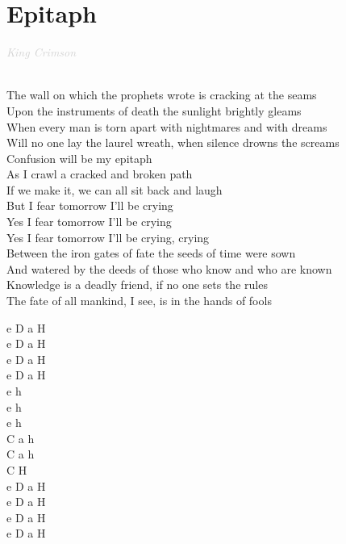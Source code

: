 \documentclass[a5paper, 10pt]{book}
\begin{document}
\section{Epitaph}\textcolor{lightgray}{\textit{King Crimson}}\\~\\
\begin{minipage}[t]{0.8\textwidth}
The wall on which the prophets wrote is cracking at the seams\\
Upon the instruments of death the sunlight brightly gleams\\
When every man is torn apart with nightmares and with dreams\\
Will no one lay the laurel wreath, when silence drowns the screams\\

\hspace*{5mm}Confusion will be my epitaph\\
\hspace*{5mm}As I crawl a cracked and broken path\\
\hspace*{5mm}If we make it, we can all sit back and laugh\\
\hspace*{5mm}But I fear tomorrow I'll be crying\\
\hspace*{5mm}Yes I fear tomorrow I'll be crying\\
\hspace*{5mm}Yes I fear tomorrow I'll be crying, crying\\

Between the iron gates of fate the seeds of time were sown\\
And watered by the deeds of those who know and who are known\\
Knowledge is a deadly friend, if no one sets the rules\\
The fate of all mankind, I see, is in the hands of fools\\
\end{minipage}
\begin{minipage}[t]{0.2\textwidth}
 e D a H\\
 e D a H\\
 e D a H\\
 e D a H\\
 
 e h\\
 e h\\
 e h\\
 C a h\\
 C a h\\
 C H\\

  e D a H\\
 e D a H\\
 e D a H\\
 e D a H\\
\end{minipage}
\end{document}
